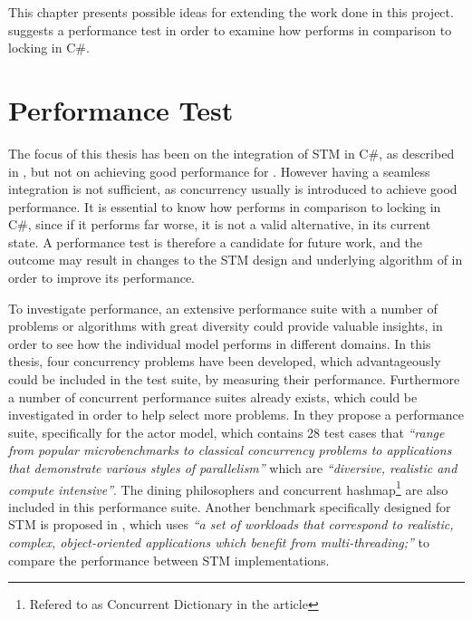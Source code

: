 \makeatletter {}\makeatother
{}
This chapter presents possible ideas for extending the work done in this project.  suggests a performance test in order to examine how \stmname performs in comparison to locking in C\#.

\label{chap:future_work}
\section{Performance Test}\label{sec:fut_perf_test}
The focus of this thesis has been on the integration of \ac{STM} in C\#, as described in , but not on achieving good performance for \stmname.
However having a seamless integration is not sufficient, as concurrency usually is introduced to achieve good performance. It is essential to know how \stmname performs in comparison to locking in C\#, since if it performs far worse, it is not a valid alternative, in its current state. A performance test is therefore a candidate for future work, and the outcome may result in changes to the \ac{STM} design and underlying algorithm of \stmname in order to improve its performance.

To investigate performance, an extensive performance suite with a number of problems or algorithms with great diversity could provide valuable insights, in order to see how the individual model performs in different domains. In this thesis, four concurrency problems have been developed, which advantageously could be included in the test suite, by measuring their performance. Furthermore a number of concurrent performance suites already exists, which could be investigated in order to help select more problems. In \cite{imam2014savina} they propose a performance suite, specifically for the actor model, which contains 28 test cases that \textit{``range from popular microbenchmarks to classical concurrency problems to applications that demonstrate various styles of parallelism''} which are \textit{``diversive, realistic and compute intensive''}. The dining philosophers and concurrent hashmap\footnote{Refered to as Concurrent Dictionary in the article} are also included in this performance suite. Another benchmark specifically designed for \ac{STM} is proposed in \cite{guerraoui2006stmbench7}, which uses \textit{``a set of workloads that correspond to realistic, complex, object-oriented applications which benefit from multi-threading;''} to compare the performance between \ac{STM} implementations. 

